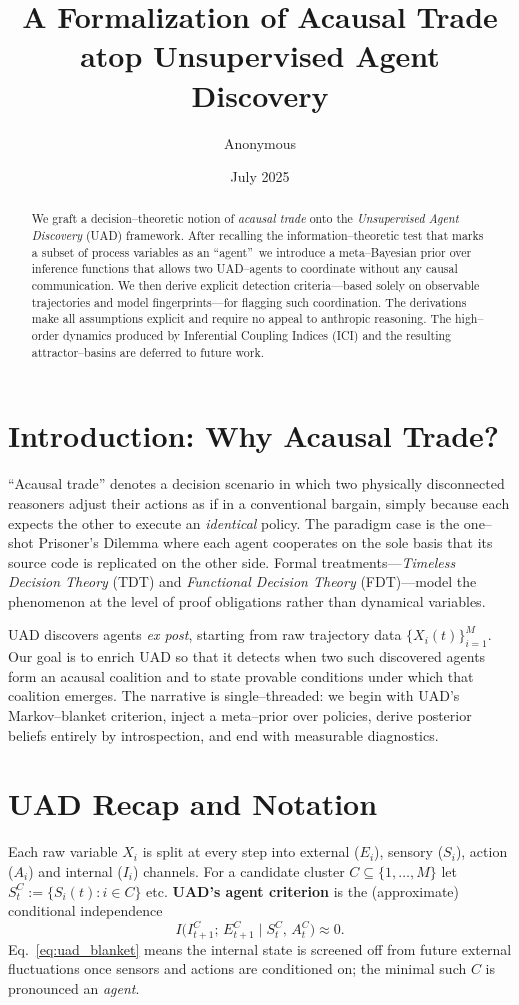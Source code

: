 \documentclass[11pt]{article}
\title{A Formalization of Acausal Trade atop Unsupervised Agent Discovery}
\author{Anonymous}
\date{July 2025}
\begin{document}
\maketitle
\begin{abstract}
We graft a decision--theoretic notion of \emph{acausal trade} onto the
\emph{Unsupervised Agent Discovery} (UAD) framework.  After recalling the
information--theoretic test that marks a subset of process variables as an
``agent''\, we introduce a meta--Bayesian prior over inference functions that
allows two UAD--agents to coordinate without any causal communication.  We then
derive explicit detection criteria---based solely on observable trajectories
and model fingerprints---for flagging such coordination.  The derivations make
all assumptions explicit and require no appeal to anthropic reasoning.  The
high--order dynamics produced by Inferential Coupling Indices (ICI) and the
resulting attractor–basins are deferred to future work.
\end{abstract}
\section{Introduction:  Why Acausal Trade?}
``Acausal trade''\cite{tdt2010} denotes a decision scenario in which two
physically disconnected reasoners adjust their actions as if in a conventional
bargain, simply because each expects the other to execute an \emph{identical}
policy.  The paradigm case is the one--shot Prisoner’s Dilemma where each agent
cooperates on the sole basis that its source code is replicated on the other
side.  Formal treatments---\emph{Timeless Decision Theory} (TDT)\cite{tdt2010}
and \emph{Functional Decision Theory} (FDT)\cite{fdt2017}---model the
phenomenon at the level of proof obligations rather than dynamical variables.

UAD\cite{uad2025} discovers agents \emph{ex post}, starting from raw
trajectory data $\{X_i(t)\}_{i=1}^{M}$.  Our goal is to enrich UAD so that it
detects when two such discovered agents form an acausal coalition and to state
provable conditions under which that coalition emerges.  The narrative is
single--threaded:  we begin with UAD’s Markov–blanket criterion, inject a
meta--prior over policies, derive posterior beliefs entirely by introspection,
and end with measurable diagnostics.

\section{UAD Recap and Notation}
Each raw variable $X_i$ is split at every step into external ($E_i$), sensory
($S_i$), action ($A_i$) and internal ($I_i$) channels.  For a candidate cluster
$C\subseteq\{1,\dots,M\}$ let $S^C_t:=\{S_i(t):i\in C\}$ etc.  \textbf{UAD’s
agent criterion}\cite{uad2025} is the (approximate) conditional independence
\begin{equation}\label{eq:uad_blanket}
I\bigl(I^C_{t+1};\,E^C_{t+1}\mid S^C_t,\,A^C_t\bigr) \approx 0.
\end{equation}
Eq.~\eqref{eq:uad_blanket} means the internal state is screened off from future
external fluctuations once sensors and actions are conditioned on; the minimal
such $C$ is pronounced an \emph{agent}.
\end{document}
